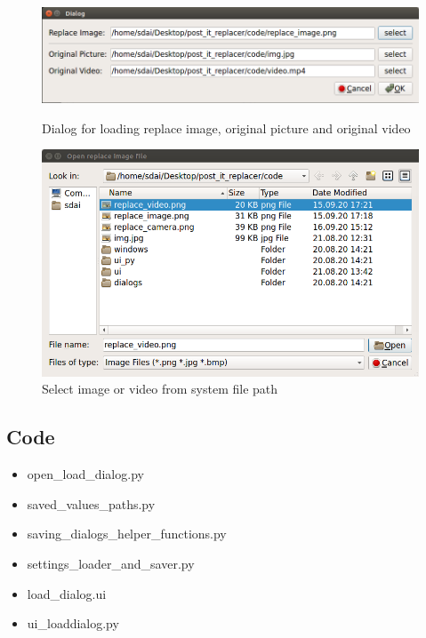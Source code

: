 \documentclass[a4paper, twoside]{report}
\begin{document}
{{\begin{figure}[h!]
\centering
\includegraphics[width=.9\textwidth]{dialog.png}
\caption{Dialog for loading replace image, original picture and original video}
\vspace{5mm}
\includegraphics[width=.9\textwidth]{dialog_load.png}
\caption{Select image or video from system file path}
\end{figure}

\subsection{Code}

\begin{itemize}
\item open{\_}load{\_}dialog.py
\item saved{\_}values{\_}paths.py
\item saving{\_}dialogs{\_}helper{\_}functions.py
\item settings{\_}loader{\_}and{\_}saver.py
\item load{\_}dialog.ui
\item ui{\_}loaddialog.py
\end{itemize}








}}
\end{document}
